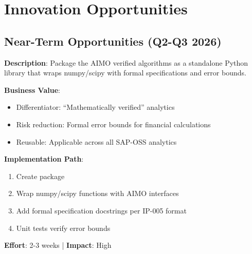 \section{Innovation Opportunities}

\subsection{Near-Term Opportunities (Q2-Q3 2026)}

\begin{tcolorbox}[colback=green!5,colframe=green!70,title=\faIcon{rocket} Opportunity: AIMO Library Package (IP-005)]
\textbf{Description}: Package the AIMO verified algorithms as a standalone Python library that wraps numpy/scipy with formal specifications and error bounds.

\textbf{Business Value}:
\begin{itemize}[nosep]
    \item Differentiator: ``Mathematically verified'' analytics
    \item Risk reduction: Formal error bounds for financial calculations
    \item Reusable: Applicable across all SAP-OSS analytics
\end{itemize}

\textbf{Implementation Path}:
\begin{enumerate}[nosep]
    \item Create  package
    \item Wrap numpy/scipy functions with AIMO interfaces
    \item Add formal specification docstrings per IP-005 format
    \item Unit tests verify error bounds
\end{enumerate}

\textbf{Effort}: 2-3 weeks | \textbf{Impact}: High
\end{tcolorbox}

